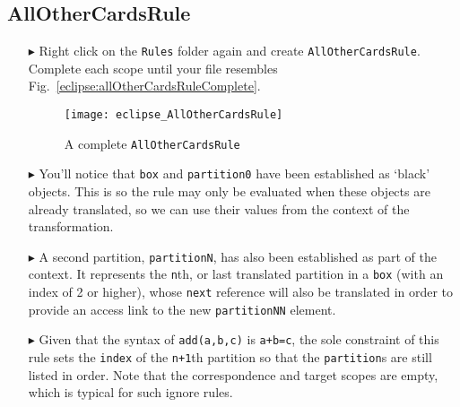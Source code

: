 \newpage
\hypertarget{allCards tex}{}
\subsection{AllOtherCardsRule}
\texHeader

\begin{itemize}

\item[$\blacktriangleright$] Right click on the \texttt{Rules} folder again and create \texttt{AllOtherCardsRule}. Complete each scope until your file resembles
Fig.~\ref{eclipse:allOtherCardsRuleComplete}.

\vspace{0.5cm}

\begin{figure}[htbp]
\begin{center}
  \texttt{[image: eclipse\_AllOtherCardsRule]}
  \caption{A complete \texttt{AllOtherCardsRule}}
  \label{eclipse:AllOtherPartitionsRuleComplete}
\end{center}
\end{figure}

\item[$\blacktriangleright$] You'll notice that \texttt{box} and \texttt{partition0} have been established as `black' objects. This is so the rule may only be
evaluated when these objects are already translated, so we can use their values from the context of the transformation.

\vspace{0.5cm}

\item[$\blacktriangleright$] A second partition, \texttt{partitionN}, has also been established as part of the context. It represents the \texttt{n}th, or last
translated partition in a \texttt{box} (with an index of 2 or higher), whose \texttt{next} reference will also be translated in order to provide an access
link to the new \texttt{partitionNN} element.

\newpage

\item[$\blacktriangleright$] Given that the syntax of \texttt{add(a,b,c)} is \texttt{a+b=c}, the sole constraint of this rule sets the \texttt{index}
of the \texttt{n+1}th partition so that the \texttt{partition}s are still listed in order. Note that the correspondence and target scopes are empty, which is typical
for such ignore rules.

\vspace{0.5cm}


\end{itemize}
